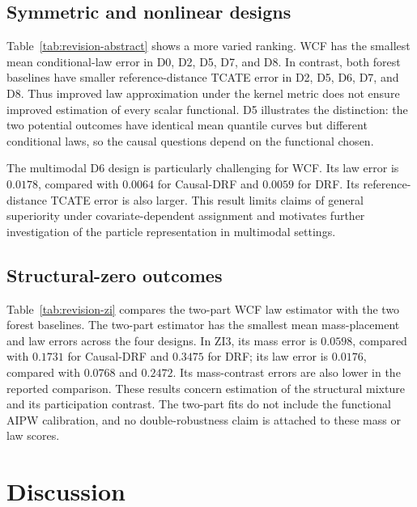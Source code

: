 \documentclass[11pt]{article}
\begin{document}



\subsection{Symmetric and nonlinear designs}

Table~\ref{tab:revision-abstract} shows a more varied ranking. WCF has the smallest mean conditional-law error in D0, D2, D5, D7, and D8. In contrast, both forest baselines have smaller reference-distance TCATE error in D2, D5, D6, D7, and D8. Thus improved law approximation under the kernel metric does not ensure improved estimation of every scalar functional. D5 illustrates the distinction: the two potential outcomes have identical mean quantile curves but different conditional laws, so the causal questions depend on the functional chosen.

The multimodal D6 design is particularly challenging for WCF. Its law error is $0.0178$, compared with $0.0064$ for Causal-DRF and $0.0059$ for DRF. Its reference-distance TCATE error is also larger. This result limits claims of general superiority under covariate-dependent assignment and motivates further investigation of the particle representation in multimodal settings.



\subsection{Structural-zero outcomes}

Table~\ref{tab:revision-zi} compares the two-part WCF law estimator with the two forest baselines. The two-part estimator has the smallest mean mass-placement and law errors across the four designs. In ZI3, its mass error is $0.0598$, compared with $0.1731$ for Causal-DRF and $0.3475$ for DRF; its law error is $0.0176$, compared with $0.0768$ and $0.2472$. Its mass-contrast errors are also lower in the reported comparison. These results concern estimation of the structural mixture and its participation contrast. The two-part fits do not include the functional AIPW calibration, and no double-robustness claim is attached to these mass or law scores.





\section{Discussion}\label{sec:discussion}
\end{document}
